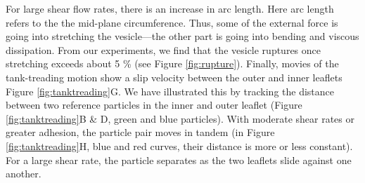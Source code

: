 For large shear flow rates, there is an increase in arc length. Here arc
length refers to the the mid-plane circumference. Thus, some of the
external force is going into stretching the vesicle---the other part is
going into bending and viscous dissipation. From our experiments, we
find that the vesicle ruptures once stretching exceeds about 5 \% (see
Figure \ref{fig:rupture}). Finally, movies of the tank-treading motion
show a slip velocity between the outer and inner leaflets Figure
\ref{fig:tanktreading}G. We have illustrated this by tracking the
distance between two reference particles in the inner and outer leaflet
(Figure \ref{fig:tanktreading}B \& D, green and blue particles). With
moderate shear rates or greater adhesion, the particle pair moves in
tandem (in Figure \ref{fig:tanktreading}H, blue and red curves, their
distance is more or less constant). For a large shear rate, the
particle separates as the two leaflets slide against one another. 



%




